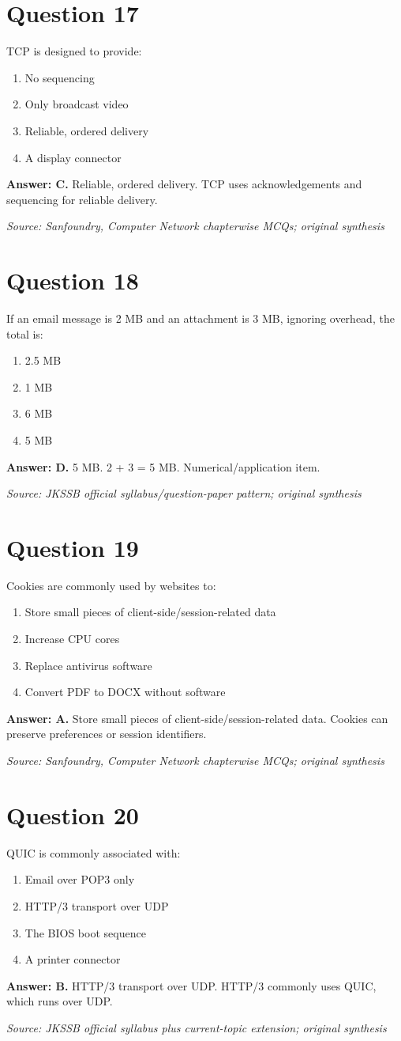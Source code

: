 \documentclass[11pt,a4paper]{book}
\newcommand{\source}[1]{\par\smallskip\textit{Source: #1}}
\newcommand{\answer}[2]{\par\textbf{Answer: #1.} #2}
\begin{document}
\section*{Question 17}
TCP is designed to provide:
\begin{enumerate}[label=\Alph*.]
\item No sequencing
\item Only broadcast video
\item Reliable, ordered delivery
\item A display connector
\end{enumerate}
\answer{C}{Reliable, ordered delivery. TCP uses acknowledgements and sequencing for reliable delivery.}
\source{Sanfoundry, Computer Network chapterwise MCQs; original synthesis}
\section*{Question 18}
If an email message is 2 MB and an attachment is 3 MB, ignoring overhead, the total is:
\begin{enumerate}[label=\Alph*.]
\item 2.5 MB
\item 1 MB
\item 6 MB
\item 5 MB
\end{enumerate}
\answer{D}{5 MB. 2 + 3 = 5 MB. Numerical/application item.}
\source{JKSSB official syllabus/question-paper pattern; original synthesis}
\section*{Question 19}
Cookies are commonly used by websites to:
\begin{enumerate}[label=\Alph*.]
\item Store small pieces of client-side/session-related data
\item Increase CPU cores
\item Replace antivirus software
\item Convert PDF to DOCX without software
\end{enumerate}
\answer{A}{Store small pieces of client-side/session-related data. Cookies can preserve preferences or session identifiers.}
\source{Sanfoundry, Computer Network chapterwise MCQs; original synthesis}
\section*{Question 20}
QUIC is commonly associated with:
\begin{enumerate}[label=\Alph*.]
\item Email over POP3 only
\item HTTP/3 transport over UDP
\item The BIOS boot sequence
\item A printer connector
\end{enumerate}
\answer{B}{HTTP/3 transport over UDP. HTTP/3 commonly uses QUIC, which runs over UDP.}
\source{JKSSB official syllabus plus current-topic extension; original synthesis}
\end{document}

